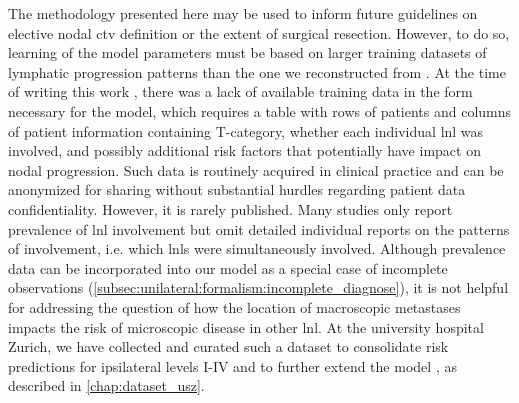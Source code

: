 \documentclass[\relativeRoot/main.tex]{subfiles}
\begin{document}
The methodology presented here may be used to inform future guidelines on elective nodal \gls{ctv} definition or the extent of surgical resection. However, to do so, learning of the model parameters must be based on larger training datasets of lymphatic progression patterns than the one we reconstructed from \cite{sanguineti_defining_2009}. At the time of writing this work \cite{ludwig_hidden_2021}, there was a lack of available training data in the form necessary for the model, which requires a table with rows of patients and columns of patient information containing T-category, whether each individual \gls{lnl} was involved, and possibly additional risk factors that potentially have impact on nodal progression. Such data is routinely acquired in clinical practice and can be anonymized for sharing without substantial hurdles regarding patient data confidentiality. However, it is rarely published. Many studies only report prevalence of \gls{lnl} involvement \cite{lindberg_distribution_1972,woolgar_histological_1999,candela_patterns_1990,vauterin_patterns_2006,ho_patterns_2012,shah_patterns_1990,razfar_incidence_2009,woolgar_topography_2007,chung_pattern_2016} but omit detailed individual reports on the patterns of involvement, i.e. which \glspl{lnl} were simultaneously involved. Although prevalence data can be incorporated into our model as a special case of incomplete observations (\cref{subsec:unilateral:formalism:incomplete_diagnose}), it is not helpful for addressing the question of how the location of macroscopic metastases impacts the risk of microscopic disease in other \gls{lnl}. At the university hospital Zurich, we have collected and curated such a dataset to consolidate risk predictions for ipsilateral levels I-IV and to further extend the model \cite{ludwig_detailed_2022,ludwig_dataset_2022}, as described in \cref{chap:dataset_usz}.
\end{document}
